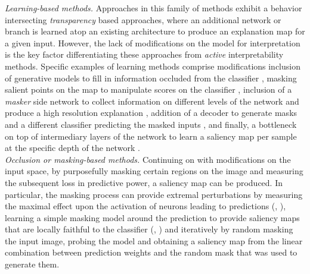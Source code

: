 \noindent \emph{Learning-based methods.} Approaches in this family of methods exhibit a behavior 
intersecting  \emph{transparency} based approaches, where an additional network or branch is 
learned atop an existing architecture to produce an explanation map for a given input. However, 
the lack of modifications on the model for interpretation is the key factor differentiating these 
approaches from \emph{active} interpretability methods. Specific examples of learning methods 
comprise modifications inclusion of generative models to fill in information occluded from  the 
classifier \autocite{chang2018explaining}, masking salient points on the map to manipulate scores 
on the classifier \autocite{dabkowski2017real}, inclusion of a \emph{masker} side network to 
collect information on different levels of the network and produce a high resolution explanation 
\autocite{phang2020investigating}, addition of a decoder to generate masks and a different 
classifier predicting the masked inputs \autocite{zolna2020classifier}, and finally, a bottleneck 
on top of intermediary layers of the network to learn a saliency map per sample at the specific 
depth of the network \autocite{schulz2020restricting}.\\

\noindent \emph{Occlusion or masking-based methods.} Continuing on with modifications on the input 
space, by purposefully masking certain regions on the image and measuring the subsequent loss in 
predictive power, a saliency map can be produced. In particular, the masking process can provide 
extremal perturbations by measuring the maximal effect upon the activation of neurons leading to 
predictions (\cite{fong2017interpretable}, \cite{fong2019understanding}), learning a 
simple masking model around the prediction to provide saliency maps that are locally faithful to the 
classifier (\cite{ribeiro2016should}, \cite{petsiuk2018rise}) and iteratively by random masking the 
input image, probing the model and obtaining a saliency map from the linear combination between 
prediction weights and the random mask that was used to generate them. \\

